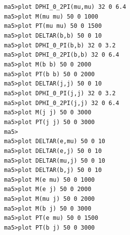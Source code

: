 \documentclass[a4paper, 10pt]{article}
\begin{document}
\texttt{ }\texttt{ }\texttt{ma5>plot DPHI\_0\_2PI(mu,mu)   32 0 6.4\\
}
\texttt{ }\texttt{ }\texttt{ma5>plot M(mu mu)            50 0 1000\\
}
\texttt{ }\texttt{ }\texttt{ma5>plot PT(mu mu)           50 0 1500\\
}
\texttt{ }\texttt{ }\texttt{ma5>plot DELTAR(b,b)         50 0 10\\
}
\texttt{ }\texttt{ }\texttt{ma5>plot DPHI\_0\_PI(b,b)      32 0 3.2\\
}
\texttt{ }\texttt{ }\texttt{ma5>plot DPHI\_0\_2PI(b,b)     32 0 6.4\\
}
\texttt{ }\texttt{ }\texttt{ma5>plot M(b b)              50 0 2000\\
}
\texttt{ }\texttt{ }\texttt{ma5>plot PT(b b)             50 0 2000\\
}
\texttt{ }\texttt{ }\texttt{ma5>plot DELTAR(j,j)         50 0 10\\
}
\texttt{ }\texttt{ }\texttt{ma5>plot DPHI\_0\_PI(j,j)      32 0 3.2\\
}
\texttt{ }\texttt{ }\texttt{ma5>plot DPHI\_0\_2PI(j,j)     32 0 6.4\\
}
\texttt{ }\texttt{ }\texttt{ma5>plot M(j j)              50 0 3000\\
}
\texttt{ }\texttt{ }\texttt{ma5>plot PT(j j)             50 0 3000\\
}
\texttt{ }\texttt{ }\texttt{ma5>\\
}
\texttt{ }\texttt{ }\texttt{ma5>plot DELTAR(e,mu)        50 0 10\\
}
\texttt{ }\texttt{ }\texttt{ma5>plot DELTAR(e,j)         50 0 10\\
}
\texttt{ }\texttt{ }\texttt{ma5>plot DELTAR(mu,j)        50 0 10\\
}
\texttt{ }\texttt{ }\texttt{ma5>plot DELTAR(b,j)         50 0 10\\
}
\texttt{ }\texttt{ }\texttt{ma5>plot M(e mu)             50 0 1000\\
}
\texttt{ }\texttt{ }\texttt{ma5>plot M(e j)              50 0 2000\\
}
\texttt{ }\texttt{ }\texttt{ma5>plot M(mu j)             50 0 2000\\
}
\texttt{ }\texttt{ }\texttt{ma5>plot M(b j)              50 0 3000\\
}
\texttt{ }\texttt{ }\texttt{ma5>plot PT(e mu)            50 0 1500\\
}
\texttt{ }\texttt{ }\texttt{ma5>plot PT(b j)             50 0 3000\\
}
\end{document}
